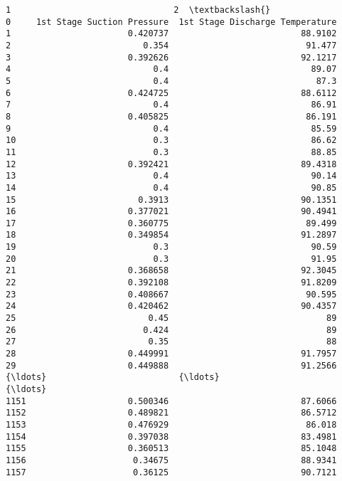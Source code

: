 \documentclass[11pt]{article}
\begin{document}
\begin{tcolorbox}[breakable, size=fbox, boxrule=.5pt, pad at break*=1mm, opacityfill=0]
\begin{Verbatim}[commandchars=\\\{\}]
                               1                                2  \textbackslash{}
0     1st Stage Suction Pressure  1st Stage Discharge Temperature
1                       0.420737                          88.9102
2                          0.354                           91.477
3                       0.392626                          92.1217
4                            0.4                            89.07
5                            0.4                             87.3
6                       0.424725                          88.6112
7                            0.4                            86.91
8                       0.405825                           86.191
9                            0.4                            85.59
10                           0.3                            86.62
11                           0.3                            88.85
12                      0.392421                          89.4318
13                           0.4                            90.14
14                           0.4                            90.85
15                        0.3913                          90.1351
16                      0.377021                          90.4941
17                      0.360775                           89.499
18                      0.349854                          91.2897
19                           0.3                            90.59
20                           0.3                            91.95
21                      0.368658                          92.3045
22                      0.392108                          91.8209
23                      0.408667                           90.595
24                      0.420462                          90.4357
25                          0.45                               89
26                         0.424                               89
27                          0.35                               88
28                      0.449991                          91.7957
29                      0.449888                          91.2566
{\ldots}                          {\ldots}                              {\ldots}
1151                    0.500346                          87.6066
1152                    0.489821                          86.5712
1153                    0.476929                           86.018
1154                    0.397038                          83.4981
1155                    0.360513                          85.1048
1156                     0.34675                          88.9341
1157                     0.36125                          90.7121

\end{Verbatim}
\end{tcolorbox}
\end{document}
